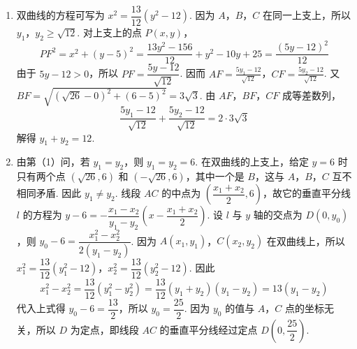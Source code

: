 \begin{solution}
\begin{enumerate}
\item 双曲线的方程可写为 \(x^2=\dfrac{13}{12}(y^2-12)\). 因为 \(A\)，\(B\)，\(C\) 在同一上支上，所以 \(y_1\)，\(y_2\geqslant\sqrt{12}\). 对上支上的点 \(P(x,y)\)，
\[
PF^2=x^2+(y-5)^2=\frac{13y^2-156}{12}+y^2-10y+25=\frac{(5y-12)^2}{12}
\]
由于 \(5y-12>0\)，所以 \(PF=\dfrac{5y-12}{\sqrt{12}}\). 因而
\(AF=\frac{5y_1-12}{\sqrt{12}}\)，\(CF=\frac{5y_2-12}{\sqrt{12}}\).
又 \(BF=\sqrt{(\sqrt{26}-0)^2+(6-5)^2}=3\sqrt{3}\). 由 \(AF\)，\(BF\)，\(CF\) 成等差数列，
\[
\frac{5y_1-12}{\sqrt{12}}+\frac{5y_2-12}{\sqrt{12}}=2\cdot3\sqrt{3}
\]
解得 \(y_1+y_2=12\).

\item 由第（1）问，若 \(y_1=y_2\)，则 \(y_1=y_2=6\). 在双曲线的上支上，给定 \(y=6\) 时只有两个点 \((\sqrt{26},6)\) 和 \((-\sqrt{26},6)\)，其中一个是 \(B\)，这与 \(A\)，\(B\)，\(C\) 互不相同矛盾. 因此 \(y_1\ne y_2\). 线段 \(AC\) 的中点为 \(\left( \dfrac{x_1+x_2}{2},6 \right)\)，故它的垂直平分线 \(l\) 的方程为 \(y-6=-\dfrac{x_1-x_2}{y_1-y_2}\left( x-\dfrac{x_1+x_2}{2} \right)\). 设 \(l\) 与 \(y\) 轴的交点为 \(D(0,y_0)\)，则 \(y_0-6=\dfrac{x_1^2-x_2^2}{2(y_1-y_2)}\).
因为 \(A(x_1,y_1)\)，\(C(x_2,y_2)\) 在双曲线上，所以 \(x_1^2=\dfrac{13}{12}(y_1^2-12)\)，\(x_2^2=\dfrac{13}{12}(y_2^2-12)\). 因此
\[x_1^2-x_2^2=\frac{13}{12}(y_1^2-y_2^2)=\frac{13}{12}(y_1+y_2)(y_1-y_2)=13(y_1-y_2)\]
代入上式得 \(y_0-6=\dfrac{13}{2}\)，所以 \(y_0=\dfrac{25}{2}\).
因为 \(y_0\) 的值与 \(A\)，\(C\) 点的坐标无关，所以 \(D\) 为定点，即线段 \(AC\) 的垂直平分线经过定点 \(D\left( 0,\dfrac{25}{2} \right)\).
\end{enumerate}
\end{solution}
